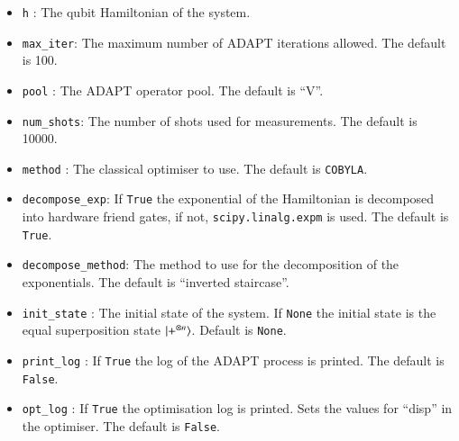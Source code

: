 \begin{itemize}
    \item \texttt{h} : The qubit Hamiltonian of the system.
    \item \texttt{max\_iter}: The maximum number of ADAPT iterations allowed. The default is 100.
    \item \texttt{pool} : The ADAPT operator pool. The default is ``V''.
	\item \texttt{num\_shots}: The number of shots used for measurements. The default is 10000.
	\item \texttt{method} : The classical optimiser to use. The default is \texttt{COBYLA}.
		\item \texttt{decompose\_exp}: If \texttt{True} the exponential of the Hamiltonian is decomposed into hardware friend gates, if not, \texttt{scipy.linalg.expm} is used. The default is \texttt{True}.
	\item \texttt{decompose\_method}: The method to use for the decomposition of the exponentials. The default is ``inverted staircase''.
	\item \texttt{init\_state} : The initial state of the system. If \texttt{None} the initial state is the equal superposition state $ \ket{+^{\otimes n}} $. Default is \texttt{None}.
	\item \texttt{print\_log} : If \texttt{True} the log of the ADAPT process is printed. The default is \texttt{False}.
	\item \texttt{opt\_log} : If \texttt{True} the optimisation log is printed. Sets the values for ``disp'' in the optimiser. The default is \texttt{False}.
    \end{itemize}

